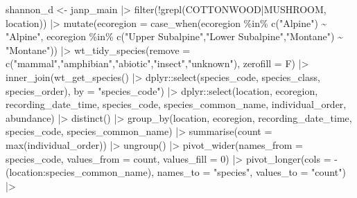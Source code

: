 \documentclass[
  letterpaper,
  DIV=11,
  numbers=noendperiod]{scrartcl}
\newenvironment{Shaded}{\begin{snugshade}}{\end{snugshade}}
\newcommand{\AttributeTok}[1]{\textcolor[rgb]{0.40,0.45,0.13}{#1}}
\newcommand{\DecValTok}[1]{\textcolor[rgb]{0.68,0.00,0.00}{#1}}
\newcommand{\FunctionTok}[1]{\textcolor[rgb]{0.28,0.35,0.67}{#1}}
\newcommand{\NormalTok}[1]{\textcolor[rgb]{0.00,0.23,0.31}{#1}}
\newcommand{\OtherTok}[1]{\textcolor[rgb]{0.00,0.23,0.31}{#1}}
\newcommand{\SpecialCharTok}[1]{\textcolor[rgb]{0.37,0.37,0.37}{#1}}
\newcommand{\StringTok}[1]{\textcolor[rgb]{0.13,0.47,0.30}{#1}}
\begin{document}
\begin{Shaded}
\begin{Highlighting}[]
\NormalTok{shannon\_d }\OtherTok{\textless{}{-}}\NormalTok{ janp\_main }\SpecialCharTok{|\textgreater{}} 
  \FunctionTok{filter}\NormalTok{(}\SpecialCharTok{!}\FunctionTok{grepl}\NormalTok{(}\StringTok{\textquotesingle{}COTTONWOOD|MUSHROOM\textquotesingle{}}\NormalTok{, location)) }\SpecialCharTok{|\textgreater{}}
  \FunctionTok{mutate}\NormalTok{(}\AttributeTok{ecoregion =} \FunctionTok{case\_when}\NormalTok{(ecoregion }\SpecialCharTok{\%in\%} \FunctionTok{c}\NormalTok{(}\StringTok{"Alpine"}\NormalTok{) }\SpecialCharTok{\textasciitilde{}} \StringTok{"Alpine"}\NormalTok{,}
\NormalTok{                               ecoregion }\SpecialCharTok{\%in\%} \FunctionTok{c}\NormalTok{(}\StringTok{"Upper Subalpine"}\NormalTok{,}\StringTok{"Lower Subalpine"}\NormalTok{,}\StringTok{"Montane"}\NormalTok{) }\SpecialCharTok{\textasciitilde{}} \StringTok{"Montane"}\NormalTok{)) }\SpecialCharTok{|\textgreater{}}
  \FunctionTok{wt\_tidy\_species}\NormalTok{(}\AttributeTok{remove =} \FunctionTok{c}\NormalTok{(}\StringTok{"mammal"}\NormalTok{,}\StringTok{"amphibian"}\NormalTok{,}\StringTok{"abiotic"}\NormalTok{,}\StringTok{"insect"}\NormalTok{,}\StringTok{"unknown"}\NormalTok{), }\AttributeTok{zerofill =}\NormalTok{ F) }\SpecialCharTok{|\textgreater{}}
  \FunctionTok{inner\_join}\NormalTok{(}\FunctionTok{wt\_get\_species}\NormalTok{() }\SpecialCharTok{|\textgreater{}}\NormalTok{ dplyr}\SpecialCharTok{::}\FunctionTok{select}\NormalTok{(species\_code, species\_class, species\_order), }\AttributeTok{by =} \StringTok{"species\_code"}\NormalTok{) }\SpecialCharTok{|\textgreater{}}
\NormalTok{  dplyr}\SpecialCharTok{::}\FunctionTok{select}\NormalTok{(location, ecoregion, recording\_date\_time, species\_code, species\_common\_name, individual\_order, abundance) }\SpecialCharTok{|\textgreater{}}
  \FunctionTok{distinct}\NormalTok{() }\SpecialCharTok{|\textgreater{}}
  \FunctionTok{group\_by}\NormalTok{(location, ecoregion, recording\_date\_time, species\_code, species\_common\_name) }\SpecialCharTok{|\textgreater{}}
  \FunctionTok{summarise}\NormalTok{(}\AttributeTok{count =} \FunctionTok{max}\NormalTok{(individual\_order)) }\SpecialCharTok{|\textgreater{}}
  \FunctionTok{ungroup}\NormalTok{() }\SpecialCharTok{|\textgreater{}}
  \FunctionTok{pivot\_wider}\NormalTok{(}\AttributeTok{names\_from =}\NormalTok{ species\_code, }\AttributeTok{values\_from =}\NormalTok{ count, }\AttributeTok{values\_fill =} \DecValTok{0}\NormalTok{) }\SpecialCharTok{|\textgreater{}}
  \FunctionTok{pivot\_longer}\NormalTok{(}\AttributeTok{cols =} \SpecialCharTok{{-}}\NormalTok{(location}\SpecialCharTok{:}\NormalTok{species\_common\_name), }\AttributeTok{names\_to =} \StringTok{"species"}\NormalTok{, }\AttributeTok{values\_to =} \StringTok{"count"}\NormalTok{) }\SpecialCharTok{|\textgreater{}}

\end{Highlighting}
\end{Shaded}
\end{document}
